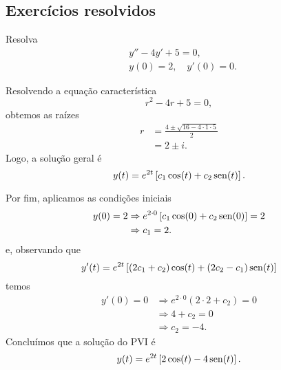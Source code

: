 \subsection*{Exercícios resolvidos}

\begin{exeresol}
  Resolva
  \begin{align}
    &y'' - 4y' + 5 = 0,\\
    &y(0) = 2,\quad y'(0)=0.
  \end{align}
\end{exeresol}
\begin{resol}
  Resolvendo a equação característica
  \begin{equation}
    r^2 - 4r + 5 = 0,
  \end{equation}
  obtemos as raízes
  \begin{align}
    r &= \frac{4 \pm \sqrt{16 - 4\cdot 1\cdot 5}}{2} \\
      &= 2 \pm i.
  \end{align}
  Logo, a solução geral é
  \begin{equation}
    y(t) = e^{2t}\left[c_1\cos(t) + c_2\operatorname{sen}(t)\right].
  \end{equation}

  Por fim, aplicamos as condições iniciais
  \begin{align}
    y(0) = 2 &\Rightarrow e^{2\cdot 0}\left[c_1\cos(0) + c_2\operatorname{sen}(0)\right] = 2 \\
             &\Rightarrow c_1 = 2.
  \end{align}
  e, observando que
  \begin{equation}
    y'(t) = e^{2t}\left[(2c_1 + c_2)\cos(t) + (2c_2 - c_1)\operatorname{sen}(t)\right]
  \end{equation}
  temos
  \begin{align}
    y'(0) = 0 &\Rightarrow e^{2\cdot 0}(2\cdot 2 + c_2) = 0 \\
              &\Rightarrow 4 + c_2 = 0 \\
              &\Rightarrow c_2 = -4.
  \end{align}
  Concluímos que a solução do PVI é
  \begin{equation}
    y(t) = e^{2t}\left[2\cos(t) - 4\operatorname{sen}(t)\right].
  \end{equation}
\end{resol}

